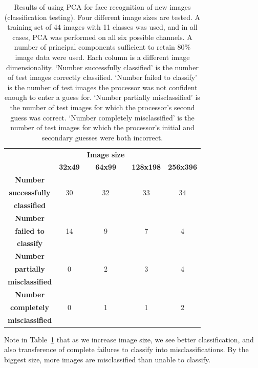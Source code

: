 \begin{table}[h!]
  \centering
  \begin{tabular}{c c c c c}
    \toprule
    \textbf{ } & \textbf{} & \textbf{Image size} & \textbf{} & \textbf{}\\
    \textbf{ } & \textbf{ 32x49 } & \textbf{ 64x99 } & \textbf{128x198} & \textbf{256x396}\\
    \midrule
    \textbf{Number} & {} & {} & {} & {} \\
    \textbf{successfully} & 30 & 32 & 33 & 34\\
    \textbf{classified} & {} & {} & {} & {} \\
    \midrule
    \textbf{Number} & {} & {} & {} & {} \\
    \textbf{failed to} & 14 & 9 & 7 & 4\\
    \textbf{classify} & {} & {} & {} & {} \\
    \midrule
    \textbf{Number} & {} & {} & {} & {} \\
    \textbf{partially} & 0 & 2 & 3 & 4\\
    \textbf{misclassified} & {} & {} & {} & {} \\
    \midrule
    \textbf{Number} & {} & {} & {} & {} \\
    \textbf{completely} & 0 & 1 & 1 & 2\\
    \textbf{misclassified} & {} & {} & {} & {} \\
    \bottomrule
  \end{tabular}
  \caption[Results of classification testing for different-sized images]{Results of using PCA for face recognition of new images (classification testing). Four different image sizes are tested. A training set of 44 images with 11 classes was used, and in all cases, PCA was performed on all six possible channels. A number of principal components sufficient to retain 80\% image data were used. Each column is a different image dimensionality. `Number successfully classified' is the number of test images correctly classified. `Number failed to classify' is the number of test images the processor was not confident enough to enter a guess for. `Number partially misclassified' is the number of test images for which the processor's second guess was correct. `Number completely misclassified' is the number of test images for which the processor's initial and secondary guesses were both incorrect.}
  \label{tbl:face-rec-3}
\end{table}

Note in Table~\ref{tbl:face-rec-3} that as we increase image size, we see better classification, and also transference of complete failures to classify into misclassifications. By the biggest size, more images are misclassified than unable to classify.


